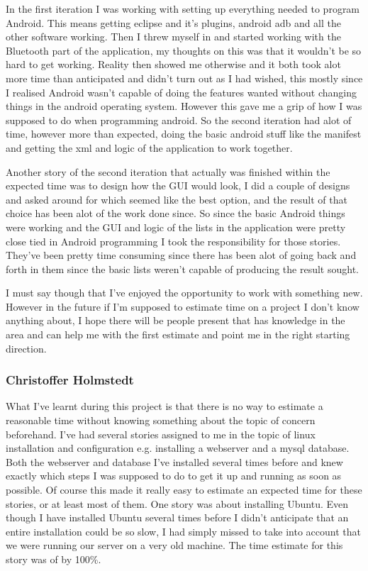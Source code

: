 In the first iteration I was working with setting up everything needed to program Android. This means getting eclipse and it's plugins, android adb and all the other software working. 
Then I threw myself in and started working with the Bluetooth part of the application, my thoughts on this was that it wouldn't be so hard to get working. 
Reality then showed me otherwise and it both took alot more time than anticipated and didn't turn out as I had wished,
this mostly since I realised Android wasn't capable of doing the features wanted without changing things in the android operating system. However this gave me a grip of how I was supposed to
do when programming android. So the second iteration had alot of time, however more than expected, doing the basic android stuff like the manifest and getting the xml and logic of the application to work together.

Another story of the second iteration that actually was finished within the expected time was to design how the GUI would look, I did a couple of designs and asked around for which seemed like the best option, and
the result of that choice has been alot of the work done since. So since the basic Android things were working and the GUI and logic of the lists in 
the application were pretty close tied in Android programming I took the responsibility for those stories. They've been pretty time consuming since there has been alot of going back and forth in them since the 
basic lists weren't capable of producing the result sought.

I must say though that I've enjoyed the opportunity to work with something new. However in the future if I'm supposed to estimate time on a project I don't know anything about, I hope 
there will be people present that has knowledge in the area and can help me with the first estimate and point me in the right starting direction.

\subsubsection{Christoffer Holmstedt}
What I've learnt during this project is that there is no way to estimate a reasonable time without knowing something about the topic of concern beforehand.
I've had several stories assigned to me in the topic of linux installation and configuration e.g. installing a webserver and a mysql database.
Both the webserver and database I've installed several times before and knew exactly which steps I was supposed to do to get it up and running as soon as possible.
Of course this made it really easy to estimate an expected time for these stories, or at least most of them.
One story was about installing Ubuntu.
Even though I have installed Ubuntu several times before I didn't anticipate that an entire installation could be so slow, I had simply missed to take into account that we were running our server on a very old machine.
The time estimate for this story was of by 100\%.

